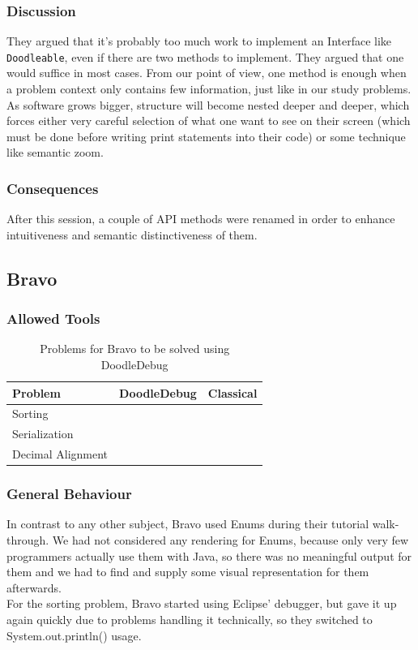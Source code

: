 \documentclass[a4paper,ngerman,english]{amsbook} %
\newcommand{\tick}{\ding{51}}
\begin{document}
\subsubsection*{Discussion}
They argued that it's probably too much work to implement an Interface like \verb.Doodleable., even if there are two methods to implement. They argued that one would suffice in most cases. From our point of view, one method is enough when a problem context only contains few information, just like in our study problems. As software grows bigger, structure will become nested deeper and deeper, which forces either very careful selection of what one want to see on their screen (which must be done before writing print statements into their code) or some technique like semantic zoom.
\subsubsection*{Consequences}
After this session, a couple of API methods were renamed in order to enhance intuitiveness and semantic distinctiveness of them.
\\

\subsection*{Bravo}
\subsubsection*{Allowed Tools}
\begin{table}[h]
\centering
\begin{tabular}{l c c}
{\bf Problem} & {\bf DoodleDebug} & {\bf Classical} \\ \hline
Sorting &  & \tick \\
Serialization & \tick &  \\
Decimal Alignment &  & \tick \\
\end{tabular}
\caption{Problems for Bravo to be solved using DoodleDebug}
\end{table}
\subsubsection*{General Behaviour}
In contrast to any other subject, Bravo used Enums during their tutorial walk-through. We had not considered any rendering for Enums, because only very few programmers actually use them with Java, so there was no meaningful output for them and we had to find and supply some visual representation for them afterwards.\\
For the sorting problem, Bravo started using Eclipse' debugger, but gave it up again quickly due to problems handling it technically, so they switched to System.out.println() usage.
\end{document}
